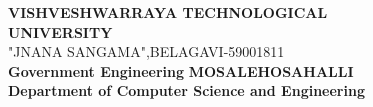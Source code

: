 \documentclass[12pt,a4paper]{report}
\begin{document}
\thispagestyle{empty}
\begin{titlepage}
\centering
{}

\textbf{\Large{VISHVESHWARRAYA TECHNOLOGICAL }}\\[0.4cm]
\vspace{0.2cm}
\textbf{\Large{UNIVERSITY}}\\[0.3cm]
\vspace{0.2cm}
\textbf\Large{"JNANA SANGAMA",BELAGAVI-59001811}\\
\vspace{0.2cm}
\textbf{Government Engineering }\textbf{MOSALEHOSAHALLI}\\
\vspace{0.1cm}
\textbf{\Large{Department of Computer Science and Engineering}}
\vspace{0.2cm}
\end{titlepage}
\end{document}

